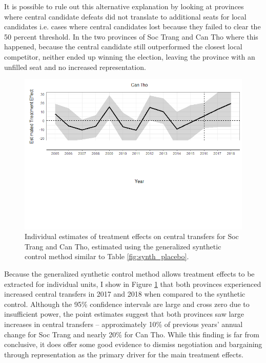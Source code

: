 \documentclass[12pt]{article}
\newcommand{\1}{\mathbbm{1}}
\begin{document}
It is possible to rule out this alternative explanation by looking at provinces where central candidate defeats did not translate to additional seats for local candidates i.e. cases where central candidates lost because they failed to clear the 50 percent threshold. In the two provinces of Soc Trang and Can Tho where this happened, because the central candidate still outperformed the closest local competitor, neither ended up winning the election, leaving the province with an unfilled seat and no increased representation. 

\begin{figure}[!htbp]
	\centering
	\includegraphics[width=\textwidth]{figure/200205_synth_results_2prov.png}
	\captionsetup{singlelinecheck=off}
	\caption[Individual synthetic control treatment effects]{Individual estimates of treatment effects on central transfers for Soc Trang and Can Tho, estimated using the generalized synthetic control method similar to Table \ref{fig:synth_placebo}.}
	\label{fig:synth_mech}
\end{figure}

Because the generalized synthetic control method allows treatment effects to be extracted for individual units, I show in Figure \ref{fig:synth_mech} that both provinces experienced increased central transfers in 2017 and 2018 when compared to the synthetic control. Although the 95\% confidence intervals are large and cross zero due to insufficient power, the point estimates suggest that both provinces saw large increases in central transfers -- approximately 10\% of previous years' annual change for Soc Trang and nearly 20\% for Can Tho. While this finding is far from conclusive, it does offer some good evidence to dismiss negotiation and bargaining through representation as the primary driver for the main treatment effects.
\end{document}
